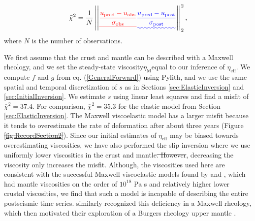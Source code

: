 \documentclass[draft,linenumbers]{AGUJournal}
\providecommand{\DIFadd}[1]{{\protect\color{blue}\uwave{#1}}} %
\providecommand{\DIFdel}[1]{{\protect\color{red}\sout{#1}}}                      %
\providecommand{\DIFaddbegin}{} %
\providecommand{\DIFaddend}{} %
\providecommand{\DIFdelbegin}{} %
\providecommand{\DIFdelend}{} %
\begin{document}
\begin{equation}\label{eq:Misfit}
  \bar\chi^2 = \frac{1}{N}\left|\left|\DIFdelbegin \DIFdel{\frac{u_\mathrm{pred} - u_\mathrm{obs}}{\sigma_\mathrm{obs}}}\DIFdelend \DIFaddbegin \DIFadd{\frac{u_\mathrm{pred} - u_\mathrm{post}}{\sigma_\mathrm{post}}}\DIFaddend \right|\right|_2^2,
\end{equation}
where $N$ is the number of observations.

We first assume that the crust and mantle can be described with a Maxwell rheology, and we set the steady-state viscosity\DIFaddbegin \DIFadd{, }\DIFaddend $\eta_\mathrm{M}$\DIFaddbegin \DIFadd{, }\DIFaddend equal to our inference of $\eta_{\mathrm{eff}}$.  We compute $f$ and $g$ from eq. (\ref{GeneralForward}) using Pylith, and we use the same spatial and temporal discretization of $s$ as in Sections \ref{sec:ElasticInversion} and \ref{sec:InitialInversion}. We estimate $s$ using linear least squares and find a misfit of $\bar\chi^2=37.4$. For comparison, $\bar\chi^2=35.3$ for the elastic model from Section \ref{sec:ElasticInversion}.  The Maxwell viscoelastic model has a larger misfit because it tends to overestimate the rate of deformation after about three years (Figure \DIFdelbegin \DIFdel{\ref{fig:RecordSection2}}\DIFdelend \DIFaddbegin \DIFadd{\ref{fig:RecordSectionMain}}\DIFaddend ). Since our initial estimates of $\eta_\mathrm{eff}$ may be biased towards overestimating viscosities, we have also performed the slip inversion where we use uniformly lower viscosities in the crust and mantle\DIFdelbegin \DIFdel{. However}\DIFdelend \DIFaddbegin \DIFadd{; however}\DIFaddend , decreasing the viscosity only increases the misfit.  Although, the viscosities used here are consistent with the successful Maxwell viscoelastic models found by \citet{Rollins2015} and \citet{Spinler2015}, which had mantle viscosities on the order of $10^{18}$ Pa s and relatively higher lower crustal viscosities, we find that such a model is incapable of describing the entire postseismic time series.  \citet{Pollitz2001} similarly recognized this deficiency in a Maxwell rheology, which then motivated their exploration of a Burgers rheology upper mantle \citep{Pollitz2003}.  
\end{document}
